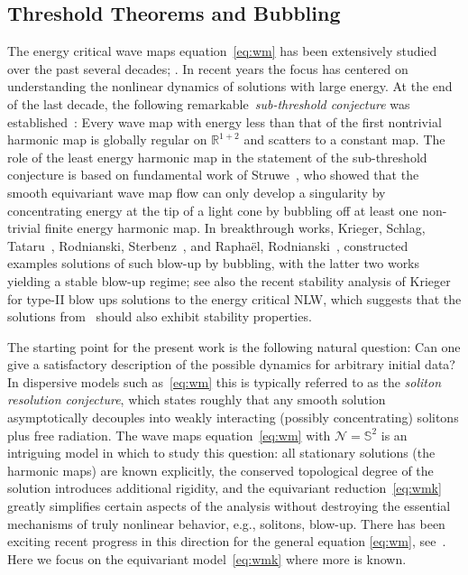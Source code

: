 \documentclass[10pt,reqno]{amsart}
\newcommand{\NN}{\mathcal{N}}
\newcommand{\R}{\mathbb{R}}
\newcommand{\Sp}{\mathbb{S}}
\numberwithin{equation}{section}
\theoremstyle{remark}
\newcommand{\0}{\emptyset}
\begin{document}
 

\subsection{Threshold Theorems and Bubbling} 
The energy critical wave maps equation~\eqref{eq:wm} has been extensively studied over the past several decades; \cite{CTZcpam, CTZduke, STZ92, STZ94, KlaMac93, KlaMac94, KlaMac95, KlaMac97, KlaSel97, KlaSel02, Tat98, Tao1, Tao2, Tat01, Kri04}. In recent years the focus has centered on understanding the nonlinear dynamics of solutions with large energy.  At the end of the last decade, the following remarkable~\emph{sub-threshold conjecture} was established~\cite{ST1, ST2, KS, Tao37}: Every wave map with energy less than that of the first nontrivial harmonic map is globally regular on $\R^{1+2}$ and scatters to a constant map.  The role of the least energy harmonic map in the statement of the sub-threshold conjecture is based on fundamental work of Struwe~\cite{Struwe}, who showed that the smooth equivariant wave map flow can only develop a singularity by concentrating energy at the tip of a light cone by bubbling off at least one non-trivial finite energy harmonic map.  In breakthrough works, Krieger, Schlag, Tataru~\cite{KST}, Rodnianski, Sterbenz~\cite{RS}, and Rapha\"el, Rodnianski~\cite{RR}, constructed examples solutions of such blow-up by bubbling, with the latter two works yielding a stable blow-up regime; see also the recent stability analysis of Krieger~\cite{Krieger17} for type-II blow ups solutions to the energy critical NLW, which suggests that the solutions from~\cite{KST} should also exhibit stability properties. 

The starting point for the present work  is the following natural question: Can one give a satisfactory description of the possible dynamics for arbitrary initial data? In dispersive models such as~\eqref{eq:wm} this is typically referred to as the \emph{soliton resolution conjecture}, which states roughly that any smooth solution asymptotically decouples into weakly interacting (possibly concentrating) solitons plus free radiation. The wave maps equation~\eqref{eq:wm} with $\NN = \Sp^2$  is an intriguing model in which to study this question: all stationary solutions (the harmonic maps) are known explicitly, the conserved topological degree of the solution introduces additional rigidity, and the equivariant reduction~\eqref{eq:wmk} greatly simplifies certain aspects of the analysis without destroying the essential mechanisms of truly nonlinear behavior, e.g., solitons, blow-up. There has been exciting recent progress in this direction for the general equation \eqref{eq:wm}, see~\cite{Gri, DJKM16}. Here we focus on the equivariant model~\eqref{eq:wmk} where more is known. 
\end{document}
